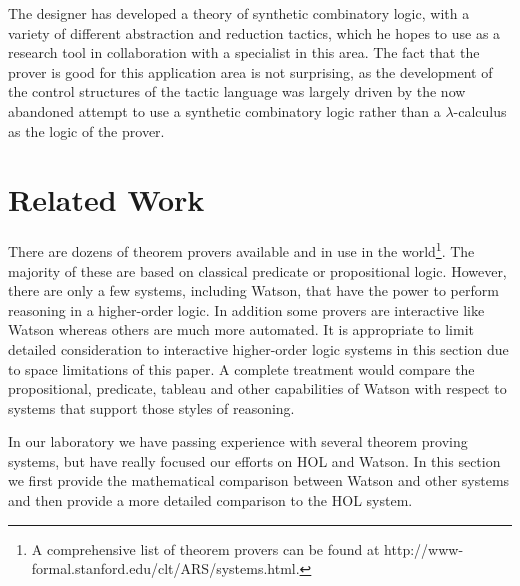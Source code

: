 \documentclass{kluwer}
\begin{document}
\begin{article}
The designer has developed a theory of synthetic combinatory logic,
with a variety of different abstraction and reduction tactics, which he
hopes to use as a research tool in collaboration with a specialist in
this area.  The fact that the prover is good for this application area
is not surprising, as the development of the control structures of the
tactic language was largely driven by the now abandoned attempt to use
a synthetic combinatory logic rather than a $\lambda$-calculus as the
logic of the prover.











\section{Related Work}

There are dozens of theorem provers available and in use in the
world\footnote{A comprehensive list of theorem provers can be found at
http://www-formal.stanford.edu/clt/ARS/systems.html.}. The majority of
these are based on classical predicate or propositional
logic. However, there are only a few systems, including Watson, that
have the power to perform reasoning in a higher-order logic.  In
addition some provers are interactive like Watson whereas others are
much more automated. It is appropriate to limit detailed consideration
to interactive higher-order logic systems in this section due to space
limitations of this paper. A complete treatment would compare the
propositional, predicate, tableau and other capabilities of Watson with
respect to systems that support those styles of reasoning.

In our laboratory we have passing experience with several theorem 
proving systems, but have really focused our efforts on 
HOL \cite{Gordon87,Camilleri87,hol} and Watson. In this section we first 
provide the mathematical comparison between Watson and other systems
and then provide a more detailed comparison to the HOL system.


\end{article}
\end{document}
